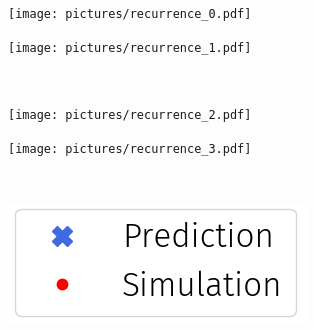 \begin{frame}
  \begin{figure}
      \begin{subfigure}{.49\textwidth}
          \centering
          \texttt{[image: pictures/recurrence\_0.pdf]}
        \end{subfigure}
        \begin{subfigure}{.49\textwidth}
          \centering
          \texttt{[image: pictures/recurrence\_1.pdf]}
        \end{subfigure}\\
        \begin{subfigure}{0.49\textwidth}
          \centering
          \texttt{[image: pictures/recurrence\_2.pdf]}
        \end{subfigure}%
        \begin{subfigure}{0.49\textwidth}
          \centering
          \texttt{[image: pictures/recurrence\_3.pdf]}
      \end{subfigure}\\
      \begin{center}
        \begin{subfigure}{0.26\textwidth}
          \centering
          \includegraphics[width=\linewidth]{pictures/legend_2.png}
        \end{subfigure}\\
      \end{center}
      \end{figure}
\end{frame}